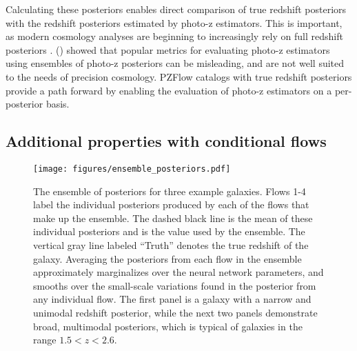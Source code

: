 \documentclass[twocolumn,twocolappendix]{aastex631}
\newcommand{\citePZt}{\citetalias{schmidt2020} (\citeyear{schmidt2020})\xspace}
\begin{document}
Calculating these posteriors enables direct comparison of true redshift posteriors with the redshift posteriors estimated by photo-z estimators.
This is important, as modern cosmology analyses are beginning to increasingly rely on full redshift posteriors \citep{mandelbaum2008,newman2022}.
\citePZt showed that popular metrics for evaluating photo-z estimators using ensembles of photo-z posteriors can be misleading, and are not well suited to the needs of precision cosmology.
PZFlow catalogs with true redshift posteriors provide a path forward by enabling the evaluation of photo-z estimators on a per-posterior basis.


\subsection{Additional properties with conditional flows}
\label{sec:fwd-model-conditional}

\begin{figure*}[t]
    \begin{centering}
        \texttt{[image: figures/ensemble\_posteriors.pdf]}
        \caption{
            The ensemble of posteriors for three example galaxies.
            Flows 1-4 label the individual posteriors produced by each of the flows that make up the ensemble.
            The dashed black line is the mean of these individual posteriors and is the value used by the ensemble.
            The vertical gray line labeled ``Truth'' denotes the true redshift of the galaxy.
            Averaging the posteriors from each flow in the ensemble approximately marginalizes over the neural network parameters, and smooths over the small-scale variations found in the posterior from any individual flow.
            The first panel is a galaxy with a narrow and unimodal redshift posterior, while the next two panels demonstrate broad, multimodal posteriors, which is typical of galaxies in the range $1.5 < z < 2.6$.
        }
        \label{fig:ensemble-posteriors}
    \end{centering}
\end{figure*}
\end{document}
